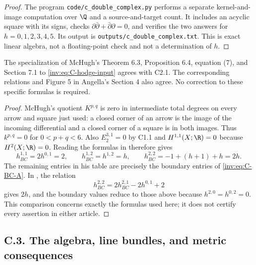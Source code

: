 \begin{proof}
The program \texttt{code/c\_double\_complex.py} performs a separate
kernel-and-image computation over $\Q$ and a source-and-target
count.  It includes an acyclic square with its signs, checks
$\partial\bar\partial+\bar\partial\partial=0$, and verifies the
two answers for $h=0,1,2,3,4,5$.  Its output is
\texttt{outputs/c\_double\_complex.txt}.  This is exact linear
algebra, not a floating-point check and not a determination of $h$.
\end{proof}

\begin{proposition}\label{inv:C2.2}
The specialization of McHugh's Theorem 6.3, Proposition 6.4, equation
(7), and Section 7.1 to \eqref{inv:eq:C-hodge-input} agrees with C2.1.
The corresponding relations and Figure 5 in Angella's Section 4 also
agree.  No correction to these specific formulas is required.
\end{proposition}
\begin{proof}
McHugh's quotient $K^{p,q}$ is zero in intermediate total degrees
on every arrow and square just used: a closed corner of an arrow is
the image of the incoming differential and a closed corner of a square
is in both images.  Thus $k^{p,q}=0$ for $0<p+q<6$.
Also $E_2^{3,1}=0$ by C1.1 and $H^{1,1}(X;\R)=0$ because
$H^2(X;\R)=0$.  Reading the formulas in
\citet[Theorem 6.3, Proposition 6.4, (7), pp. 20--25]{McHugh2018}
therefore gives
\[
h_{BC}^{1,1}=2h^{0,1}=2,\qquad
h_{BC}^{1,2}=h^{1,2}=h,\qquad
h_{BC}^{2,2}=-1+(h+1)+h=2h.
\]
The remaining entries in his table are precisely the boundary entries
of \eqref{inv:eq:C-BC-A}.  In
\citet[Section 4, pp. 13--16]{Angella2018}, the relation
\[
h_{BC}^{2,2}=2h_{BC}^{2,1}-2h^{0,1}+2
\]
gives $2h$, and the boundary values reduce to those above because
$h^{2,0}=h^{0,2}=0$.  This comparison concerns exactly the formulas
used here; it does not certify every assertion in either article.
\end{proof}

\subsection{C.3. The algebra, line bundles, and metric consequences}

